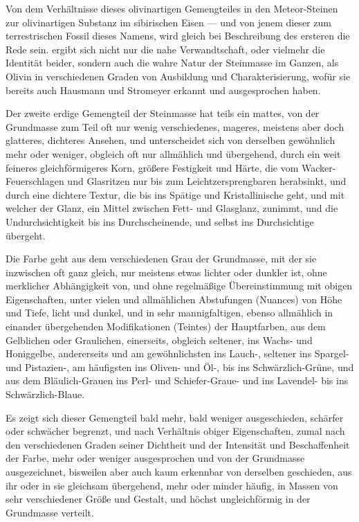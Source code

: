 \documentclass[a4paper, 11pt, oneside, german]{article}
\begin{document}
{Von dem Verhältnisse dieses olivinartigen Gemengteiles in den Meteor-Steinen zur olivinartigen Substanz im sibirischen Eisen --- und von jenem dieser zum terrestrischen Fossil dieses Namens, wird gleich bei Beschreibung des ersteren die Rede sein.} ergibt sich nicht nur die nahe Verwandtschaft, oder vielmehr die Identität beider, sondern auch die wahre Natur der Steinmasse im Ganzen, als Olivin in verschiedenen Graden von Ausbildung und Charakterisierung, wofür sie bereits auch Hausmann und Stromeyer erkannt und ausgesprochen haben.

Der zweite erdige Gemengteil der Steinmasse hat teils ein mattes, von der Grundmasse zum Teil oft nur wenig verschiedenes, mageres, meistens aber doch glatteres, dichteres Ansehen, und unterscheidet sich von derselben gewöhnlich mehr oder weniger, obgleich oft nur allmählich und übergehend, durch ein weit feineres gleichförmigeres Korn, größere Festigkeit und Härte, die vom Wacker-Feuerschlagen und Glasritzen nur bis zum Leichtzersprengbaren herabsinkt, und durch eine dichtere Textur, die bis ins Spätige und Kristallinische geht, und mit welcher der Glanz, ein Mittel zwischen Fett- und Glasglanz, zunimmt, und die Undurchsichtigkeit bis ins Durchscheinende, und selbst ins Durchsichtige übergeht.

Die Farbe geht aus dem verschiedenen Grau der Grundmasse, mit der sie inzwischen oft ganz gleich, nur meistens etwas lichter oder dunkler ist, ohne merklicher Abhängigkeit von, und ohne regelmäßige Übereinstimmung mit obigen Eigenschaften, unter vielen und allmählichen Abstufungen (Nuances) von Höhe und Tiefe, licht und dunkel, und in sehr mannigfaltigen, ebenso allmählich in einander übergehenden Modifikationen (Teintes) der Hauptfarben, aus dem Gelblichen oder Graulichen, einerseits, obgleich seltener, ins Wachs- und Honiggelbe, andererseits und am gewöhnlichsten ins Lauch-, seltener ins Spargel- und Pistazien-, am häufigsten ins Oliven- und Öl-, bis ins Schwärzlich-Grüne, und aus dem Bläulich-Grauen ins Perl- und Schiefer-Graue- und ins Lavendel- bis ins Schwärzlich-Blaue.

Es zeigt sich dieser Gemengteil bald mehr, bald weniger ausgeschieden, schärfer oder schwächer begrenzt, und nach Verhältnis obiger Eigenschaften, zumal nach den verschiedenen Graden seiner Dichtheit und der Intensität und Beschaffenheit der Farbe, mehr oder weniger ausgesprochen und von der Grundmasse ausgezeichnet, bisweilen aber auch kaum erkennbar von derselben geschieden, aus ihr oder in sie gleichsam übergehend, mehr oder minder häufig, in Massen von sehr verschiedener Größe und Gestalt, und höchst ungleichförmig in der Grundmasse verteilt.
\end{document}
